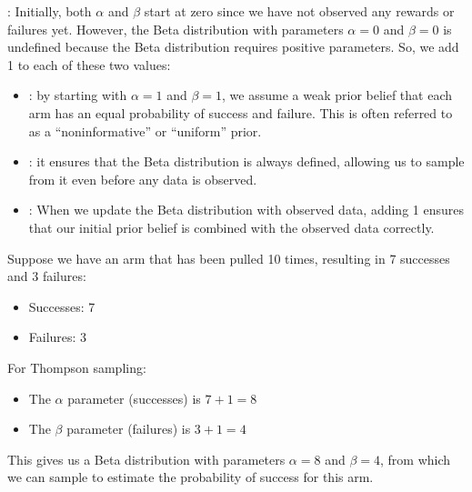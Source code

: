 \documentclass[letterpaper,10pt,english]{jupyterBook}
\begin{document}
\sphinxAtStartPar
{}:
Initially, both \(\alpha\) and \(\beta\) start at zero since we have not observed any rewards or failures yet. However, the Beta distribution with parameters \(\alpha = 0\) and \(\beta = 0\) is undefined because the Beta distribution requires positive parameters. So, we add 1 to each of these two values:
\begin{itemize}
\item {} 
\sphinxAtStartPar
{}: by starting with \(\alpha = 1\) and \(\beta = 1\), we assume a weak prior belief that each arm has an equal probability of success and failure. This is often referred to as a “non\sphinxhyphen{}informative” or “uniform” prior.

\item {} 
\sphinxAtStartPar
{}: it ensures that the Beta distribution is always defined, allowing us to sample from it even before any data is observed.

\item {} 
\sphinxAtStartPar
{}: When we update the Beta distribution with observed data, adding 1 ensures that our initial prior belief is combined with the observed data correctly.

\end{itemize}

\sphinxAtStartPar
Suppose we have an arm that has been pulled 10 times, resulting in 7 successes and 3 failures:
\begin{itemize}
\item {} 
\sphinxAtStartPar
Successes: 7

\item {} 
\sphinxAtStartPar
Failures: 3

\end{itemize}

\sphinxAtStartPar
For Thompson sampling:
\begin{itemize}
\item {} 
\sphinxAtStartPar
The \(\alpha\) parameter (successes) is \(7 + 1 = 8\)

\item {} 
\sphinxAtStartPar
The \(\beta\) parameter (failures) is \(3 + 1 = 4\)

\end{itemize}

\sphinxAtStartPar
This gives us a Beta distribution with parameters \(\alpha = 8\) and \(\beta = 4\), from which we can sample to estimate the probability of success for this arm.
\end{document}
